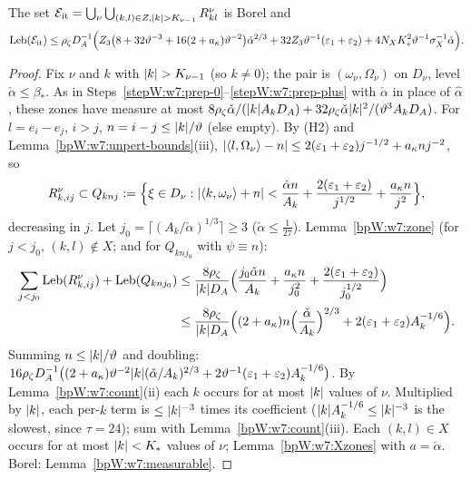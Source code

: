 \begin{proposition}\label{bpW:w7:iter}
The set $\mathcal E_{\rm it}=\bigcup_{\nu}\bigcup_{(k,l)\in Z,\lvert k\rvert>K_{\nu-1}}R^\nu_{kl}$ is Borel and
\[\operatorname{Leb}(\mathcal E_{\rm it})\le\rho_\zeta D_A^{-1}\Bigl(Z_3\bigl(8+32\vartheta^{-3}+16(2+a_\kappa)\vartheta^{-2}\bigr)
\check\alpha^{2/3}+32Z_3\vartheta^{-1}(\varepsilon_1+\varepsilon_2)+4N_XK_*^2\vartheta^{-1}\sigma_X^{-1}\check\alpha\Bigr).\]
\end{proposition}
\begin{proof}
Fix $\nu$ and $k$ with $\lvert k\rvert>K_{\nu-1}$ (so $k\ne0$); the pair is $(\omega_\nu,\Omega_\nu)$ on $D_\nu$, level
$\check\alpha\le\beta_*$.
\label{stepW:w7:it-plus}
As in Steps~\ref{stepW:w7:prep-0}--\ref{stepW:w7:prep-plus} with $\check\alpha$ in place of $\hat\alpha$, these
zones have measure at most $8\rho_\zeta\check\alpha/(\lvert k\rvert A_kD_A)+32\rho_\zeta\check\alpha\lvert k\rvert^2/(\vartheta^3A_kD_A)$.
\label{stepW:w7:it-group}
For $l=e_i-e_j$, $i>j$, $n=i-j\le\lvert k\rvert/\vartheta$ (else empty). By (H2) and Lemma~\ref{bpW:w7:unpert-bounds}(iii),
$\lvert \langle l,\Omega_\nu\rangle-n\rvert\le2(\varepsilon_1+\varepsilon_2)j^{-1/2}+a_\kappa nj^{-2}$, so
\[R^\nu_{k,ij}\subset Q_{knj}:=\Bigl\{\xi\in D_\nu:\lvert \langle k,\omega_\nu\rangle+n\rvert<\frac{\check\alpha n}{A_k}
+\frac{2(\varepsilon_1+\varepsilon_2)}{j^{1/2}}+\frac{a_\kappa n}{j^2}\Bigr\},\]
decreasing in $j$.
\label{stepW:w7:it-j0}
Let $j_0=\lceil(A_k/\check\alpha)^{1/3}\rceil\ge3$ ($\check\alpha\le\frac1{27}$). Lemma~\ref{bpW:w7:zone} (for $j<j_0$,
$(k,l)\notin X$; and for $Q_{knj_0}$ with $\psi\equiv n$):
\begin{align*}\sum_{j<j_0}\operatorname{Leb}(R^\nu_{k,ij})+\operatorname{Leb}(Q_{knj_0})&\le\frac{8\rho_\zeta}{\lvert k\rvert D_A}\Bigl(\frac{j_0\check\alpha n}{A_k}
+\frac{a_\kappa n}{j_0^2}+\frac{2(\varepsilon_1+\varepsilon_2)}{j_0^{1/2}}\Bigr)\\
&\le\frac{8\rho_\zeta}{\lvert k\rvert D_A}\Bigl((2+a_\kappa)n\Bigl(\frac{\check\alpha}{A_k}\Bigr)^{2/3}+2(\varepsilon_1+\varepsilon_2)A_k^{-1/6}\Bigr).\end{align*}
\label{stepW:w7:it-n}
Summing $n\le\lvert k\rvert/\vartheta$ and doubling:
$16\rho_\zeta D_A^{-1}\bigl((2+a_\kappa)\vartheta^{-2}\lvert k\rvert(\check\alpha/A_k)^{2/3}+2\vartheta^{-1}
(\varepsilon_1+\varepsilon_2)A_k^{-1/6}\bigr)$.
\label{stepW:w7:it-sum}
By Lemma~\ref{bpW:w7:count}(ii) each $k$ occurs for at most $\lvert k\rvert$ values of $\nu$. Multiplied by $\lvert k\rvert$, each per-$k$
term is $\le\lvert k\rvert^{-3}$ times its coefficient ($\lvert k\rvert A_k^{-1/6}\le\lvert k\rvert^{-3}$ is the slowest, since $\tau=24$); sum
with Lemma~\ref{bpW:w7:count}(iii).
\label{stepW:w7:it-X}
Each $(k,l)\in X$ occurs for at most $\lvert k\rvert<K_*$ values of $\nu$; Lemma~\ref{bpW:w7:Xzones} with $a=\check\alpha$.
Borel: Lemma~\ref{bpW:w7:measurable}.
\end{proof}

